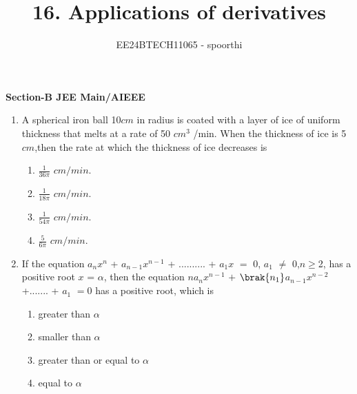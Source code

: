 \documentclass[journal,12pt,onecolumn]{IEEEtran}
\theoremstyle{remark}
\begin{document}



\title{16. Applications of derivatives}
\author{EE24BTECH11065 - spoorthi }
\newpage
\maketitle


\bigskip

\renewcommand{\thefigure}{\theenumi}
\renewcommand{\thetable}{\theenumi}
\begin{large}
\textbf{{Section-B JEE Main/AIEEE}}
\end{large}


\begin{enumerate}



    \item A spherical iron ball 10$cm$ in radius is coated with a layer of ice of uniform thickness that melts at a rate of 50 $cm^3$ /min. When the thickness of ice is 5$cm$,then the rate at which the thickness of ice decreases is\hfill{}
    \begin{multicols}{4}
    \begin{enumerate}
        \item 
        $\frac{1}{36\pi}$ $cm/min$. 
        \item $\frac{1}{18\pi}$ $cm/min$. 
        \item $\frac{1}{54\pi}$ $cm/min$. 
        \item $\frac{5}{6\pi}$  $cm/min$. 
        
    \end{enumerate}
    \end{multicols}

    
    \item If the equation $a_nx^n$ + $a$$_{n-1}x^{n-1}$ + .......... + $a_1$$x$ $=$ 0, $a_1$ $\ne$ 0,$n$$\geq$2, has a positive root $x$ = $\alpha$, then the equation $n$$a_n$$x^{n-1}$  $+$ $\brak{n_1}$$a_{n-1}$$x^{n-2}$ +....... + $a_1$ $=$0 has a positive root, which is 
    \hfill{}
     
    \begin{enumerate}
    
        
    
    
        \item greater than $\alpha$
        \item smaller than $\alpha$
        \item greater than or equal to $\alpha$
        \item equal to $\alpha$
        

\end{enumerate}
\end{enumerate}
\end{document}
